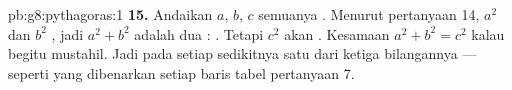 \begin{solution}{pb:g8:pythagoras:1}
\textbf{15.} Andaikan $a$, $b$, $c$ semuanya . Menurut
pertanyaan 14, $a^2$ dan $b^2$ , jadi $a^2 + b^2$ adalah 
dua : \emph{}. Tetapi $c^2$ akan \emph{}.
Kesamaan $a^2 + b^2 = c^2$ kalau begitu mustahil. Jadi pada setiap
 sedikitnya satu dari ketiga bilangannya  ---
seperti yang dibenarkan setiap baris tabel pertanyaan 7.

\end{solution}
